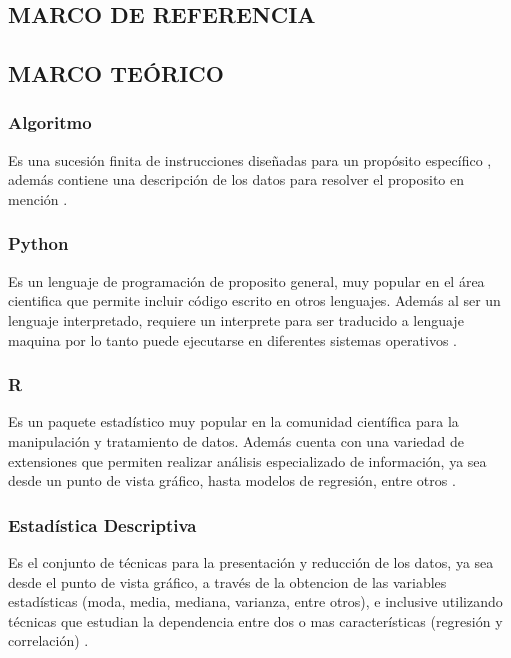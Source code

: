 \begin{center}
\section{MARCO DE REFERENCIA}
\end{center}

\subsection{MARCO TE\'ORICO}

\subsubsection{Algoritmo}

\noindent
Es una sucesi\'on finita de instrucciones diseñadas para un prop\'osito espec\'ifico \cite{Algoritmo1}, adem\'as contiene una descripci\'on de los datos para resolver el proposito en menci\'on \cite{Algoritmo2}.

\subsubsection{Python}

\noindent
Es un lenguaje de programaci\'on de proposito general, muy popular en el \'area cientifica que permite incluir c\'odigo escrito en otros lenguajes. Adem\'as al ser un lenguaje interpretado, requiere un interprete para ser traducido a lenguaje maquina por lo tanto puede ejecutarse en diferentes sistemas operativos \cite{Python}.

\subsubsection{R}

\noindent
Es un paquete estad\'istico muy popular en la comunidad cient\'ifica para la manipulaci\'on y tratamiento de datos. Adem\'as cuenta con una variedad de extensiones que permiten realizar an\'alisis especializado de informaci\'on, ya sea desde un punto de vista gr\'afico, hasta modelos de regresi\'on, entre otros \cite{R}.

\subsubsection{Estad\'istica Descriptiva}

\noindent
Es el conjunto de t\'ecnicas para la presentaci\'on y reducci\'on de los datos, ya sea desde el punto de vista gr\'afico, a trav\'es de la obtencion de las variables estad\'isticas (moda, media, mediana, varianza, entre otros), e inclusive utilizando t\'ecnicas que estudian la dependencia entre dos o mas caracter\'isticas (regresi\'on y correlaci\'on) \cite{EstadisticaDescriptiva}.

